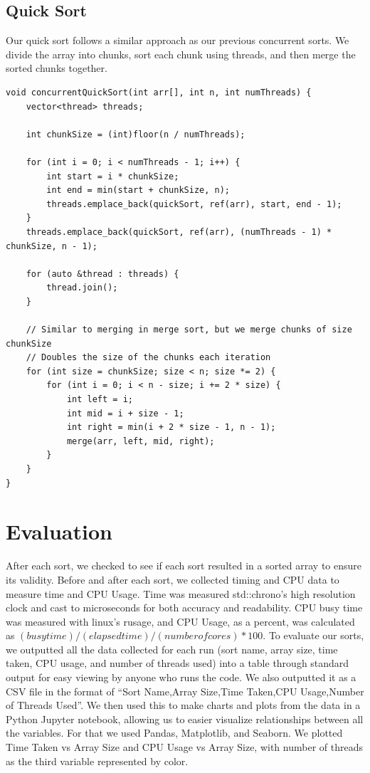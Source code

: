 \documentclass[conference]{IEEEtran}
\begin{document}
\subsection{Quick Sort}
Our quick sort follows a similar approach as our previous concurrent sorts. We divide the array into chunks, sort each chunk using threads, and then merge the sorted chunks together.
\\
\begin{lstlisting}
void concurrentQuickSort(int arr[], int n, int numThreads) {
    vector<thread> threads;

    int chunkSize = (int)floor(n / numThreads);

    for (int i = 0; i < numThreads - 1; i++) {
        int start = i * chunkSize;
        int end = min(start + chunkSize, n);
        threads.emplace_back(quickSort, ref(arr), start, end - 1);
    }
    threads.emplace_back(quickSort, ref(arr), (numThreads - 1) * chunkSize, n - 1);
    
    for (auto &thread : threads) {
        thread.join();
    }

    // Similar to merging in merge sort, but we merge chunks of size chunkSize
    // Doubles the size of the chunks each iteration
    for (int size = chunkSize; size < n; size *= 2) {
        for (int i = 0; i < n - size; i += 2 * size) {
            int left = i;
            int mid = i + size - 1;
            int right = min(i + 2 * size - 1, n - 1);
            merge(arr, left, mid, right);
        }
    }
}
\end{lstlisting}

\section{Evaluation}
After each sort, we checked to see if each sort resulted in a sorted array to ensure its validity. Before and after each sort, we collected timing and CPU data to measure time and CPU Usage. Time was measured std::chrono's high resolution clock and cast to microseconds for both accuracy and readability. CPU busy time was measured with linux's rusage, and CPU Usage, as a percent, was calculated as $(busy time) / (elapsed time) / (number of cores) * 100$. To evaluate our sorts, we outputted all the data collected for each run (sort name, array size, time taken, CPU usage, and number of threads used) into a table through standard output for easy viewing by anyone who runs the code. We also outputted it as a CSV file in the format of “Sort Name,Array Size,Time Taken,CPU Usage,Number of Threads Used”. We then used this to make charts and plots from the data in a Python Jupyter notebook, allowing us to easier visualize relationships between all the variables. For that we used Pandas, Matplotlib, and Seaborn. We plotted Time Taken vs Array Size and CPU Usage vs Array Size, with number of threads as the third variable represented by color.
\end{document}
